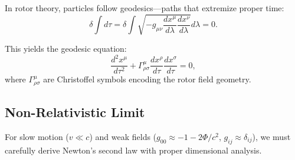 \documentclass[12pt,a4paper]{article}
\theoremstyle{definition}
\theoremstyle{remark}
\begin{document}
In rotor theory, particles follow geodesics—paths that extremize proper time:
\begin{equation}
\delta \int d\tau = \delta \int \sqrt{-g_{\mu\nu} \frac{dx^\mu}{d\lambda} \frac{dx^\nu}{d\lambda}} d\lambda = 0.
\end{equation}

This yields the geodesic equation:
\begin{equation}
\frac{d^2 x^\mu}{d\tau^2} + \Gamma^\mu_{\rho\sigma} \frac{dx^\rho}{d\tau} \frac{dx^\sigma}{d\tau} = 0,
\end{equation}
where $\Gamma^\mu_{\rho\sigma}$ are Christoffel symbols encoding the rotor field geometry.

\subsection{Non-Relativistic Limit}

For slow motion ($v \ll c$) and weak fields ($g_{00} \approx -1 - 2\Phi/c^2$, $g_{ij} \approx \delta_{ij}$), we must carefully derive Newton's second law with proper dimensional analysis.
\end{document}
